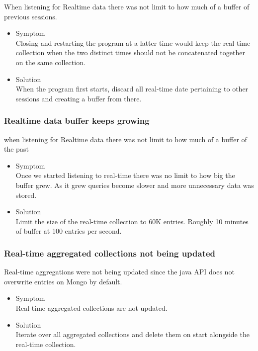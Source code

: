\documentclass[oneside, english, final]{design}
\begin{document}
When listening for Realtime data there was not limit to how much of a buffer of previous sessions.

\begin{itemize}
      \item{Symptom
            \\
            Closing and restarting the program at a latter time would keep the real-time collection when the two distinct times should not be concatenated together on the same collection.
	}
      \item{Solution
            \\
            When the program first starts, discard all real-time date pertaining to other sessions and creating a buffer from there.
            }
\end{itemize}


\subsubsection{Realtime data buffer keeps growing}

when listening for Realtime data there was not limit to how much of a buffer of the past 

\begin{itemize}
      \item{Symptom
            \\
            Once we started listening to real-time there was no limit to how big the buffer grew. As it grew queries become slower and more unnecessary data was stored.
	}
      \item{Solution
            \\
            Limit the size of the real-time collection to 60K entries. Roughly 10 minutes of buffer at 100 entries per second.
            }
\end{itemize}

\subsubsection{Real-time  aggregated collections not being updated}

Real-time aggregations were not being updated since the java API does not overwrite entries on Mongo by default.

\begin{itemize}
      \item{Symptom
            \\
            Real-time aggregated collections are not updated.
	}
      \item{Solution
            \\
            Iterate over all aggregated collections and delete them on start alongside the real-time collection.
            }
\end{itemize}
\end{document}
